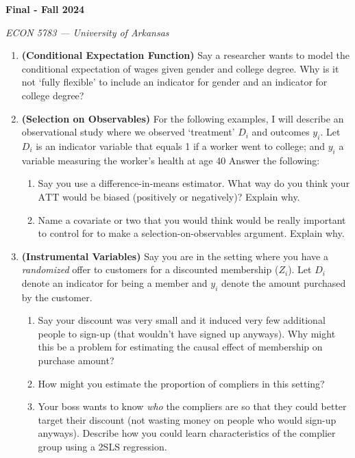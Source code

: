 \documentclass[12pt]{article}
\begin{document}
\begin{center}
  {\Huge\bf Final - Fall 2024}
  
  \smallskip
  {\large\it ECON 5783 — University of Arkansas}
\end{center}

\medskip
\begin{enumerate}
  \item \textbf{(Conditional Expectation Function)} Say a researcher wants to model the conditional expectation of wages given gender and college degree. Why is it not `fully flexible' to include an indicator for gender and an indicator for college degree?


  \item \textbf{(Selection on Observables)} For the following examples, I will describe an observational study where we observed `treatment' $D_i$ and outcomes $y_i$. Let $D_i$ is an indicator variable that equals 1 if a worker went to college; and $y_i$ a variable measuring the worker's health at age 40 Answer the following: 
  \begin{enumerate}[leftmargin = 2em]
    \item Say you use a difference-in-means estimator. What way do you think your $\text{ATT}$ would be biased (positively or negatively)? Explain why. 
    
    \item Name a covariate or two that you would think would be really important to control for to make a selection-on-observables argument. Explain why.
  \end{enumerate}

  \item \textbf{(Instrumental Variables)} Say you are in the setting where you have a \emph{randomized} offer to customers for a discounted membership ($Z_i$). Let $D_i$ denote an indicator for being a member and $y_i$ denote the amount purchased by the customer.
  \begin{enumerate}[leftmargin = 2em]
    \item Say your discount was very small and it induced very few additional  people to sign-up (that wouldn't have signed up anyways). Why might this be a problem for estimating the causal effect of membership on purchase amount?

    \item How might you estimate the proportion of compliers in this setting?
    
    \item Your boss wants to know \emph{who} the compliers are so that they could better target their discount (not wasting money on people who would sign-up anyways). Describe how you could learn characteristics of the complier group using a 2SLS regression.
  \end{enumerate}
  


\end{enumerate}
\end{document}
